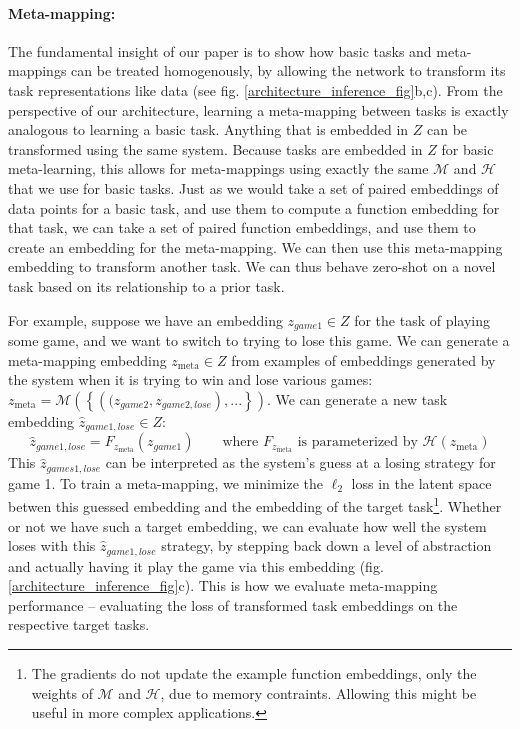 \documentclass{article}
\begin{document}
\paragraph{Meta-mapping:} The fundamental insight of our paper is to show how basic tasks and meta-mappings can be treated homogenously, by allowing the network to transform its task representations like data (see fig. \ref{architecture_inference_fig}b,c). From the perspective of our architecture, learning a meta-mapping between tasks is exactly analogous to learning a basic task. Anything that is embedded in $Z$ can be transformed using the same system. Because tasks are embedded in $Z$ for basic meta-learning, this allows for meta-mappings using exactly the same $\mathcal{M}$ and $\mathcal{H}$ that we use for basic tasks. Just as we would take a set of paired embeddings of data points for a basic task, and use them to compute a function embedding for that task, we can take a set of paired function embeddings, and use them to create an embedding for the meta-mapping. We can then use this meta-mapping embedding to transform another task. We can thus behave zero-shot on a novel task based on its relationship to a prior task. \par
For example, suppose we have an embedding $z_{game1} \in Z$ for the task of playing some game, and we want to switch to trying to lose this game. We can generate a meta-mapping embedding $z_{\text{meta}} \in Z$ from examples of embeddings generated by the system when it is trying to win and lose various games: $z_{\text{meta}} = \mathcal{M}\left( \left\{\left((z_{game2},z_{game2,lose}\right), ... \right\}\right)$. We can generate a new task embedding $\hat{z}_{game1,lose} \in Z$:  
\[\hat{z}_{game1,lose} = F_{z_{\text{meta}}}(z_{game1}) \qquad \text{where } F_{z_{\text{meta}}} \text{ is parameterized by } \mathcal{H}\left(z_{\text{meta}}\right)\]
This $\hat{z}_{games1,lose}$ can be interpreted as the system's guess at a losing strategy for game 1. To train a meta-mapping, we minimize the $\ell_2$ loss in the latent space betwen this guessed embedding and the embedding of the target task\footnote{The gradients do not update the example function embeddings, only the weights of \(\mathcal{M}\) and \(\mathcal{H}\), due to memory contraints. Allowing this might be useful in more complex applications.}. Whether or not we have such a target embedding, we can evaluate how well the system loses with this $\hat{z}_{game1,lose}$ strategy, by stepping back down a level of abstraction and actually having it play the game via this embedding (fig. \ref{architecture_inference_fig}c). This is how we evaluate meta-mapping performance -- evaluating the loss of transformed task embeddings on the respective target tasks. \par
\end{document}
